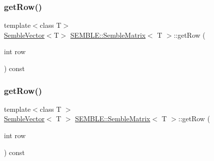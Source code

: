 \mbox{\label{structSEMBLE_1_1SembleMatrix_ad95bd96d7ebe3ece4ec35a3db8e3d517}} 
\subsubsection{\texorpdfstring{getRow()}{getRow()}\hspace{0.1cm}{\footnotesize\ttfamily [1/2]}}
{\footnotesize\ttfamily template$<$class T$>$ \\
\mbox{\hyperlink{structSEMBLE_1_1SembleVector}{Semble\+Vector}}$<$T$>$ \mbox{\hyperlink{structSEMBLE_1_1SembleMatrix}{S\+E\+M\+B\+L\+E\+::\+Semble\+Matrix}}$<$ T $>$\+::get\+Row (\begin{DoxyParamCaption}\item[{int}]{row }\end{DoxyParamCaption}) const}

\mbox{\label{structSEMBLE_1_1SembleMatrix_aeee188c8f5e6f655d9d4ae52e8ff70b4}} 
\subsubsection{\texorpdfstring{getRow()}{getRow()}\hspace{0.1cm}{\footnotesize\ttfamily [2/2]}}
{\footnotesize\ttfamily template$<$class T $>$ \\
\mbox{\hyperlink{structSEMBLE_1_1SembleVector}{Semble\+Vector}}$<$ T $>$ \mbox{\hyperlink{structSEMBLE_1_1SembleMatrix}{S\+E\+M\+B\+L\+E\+::\+Semble\+Matrix}}$<$ T $>$\+::get\+Row (\begin{DoxyParamCaption}\item[{int}]{row }\end{DoxyParamCaption}) const}

